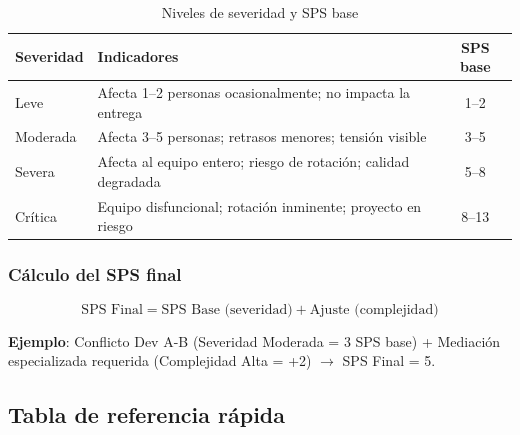 \begin{table}[h]
    \centering
    \small
    \begin{tabularx}{\textwidth}{|l|X|c|}
        \hline
        \textbf{Severidad} & \textbf{Indicadores}                                           & \textbf{SPS base} \\
        \hline
        Leve
                           & Afecta 1--2 personas ocasionalmente; no impacta la entrega
                           & 1--2                                                                               \\
        \hline
        Moderada
                           & Afecta 3--5 personas; retrasos menores; tensión visible
                           & 3--5                                                                               \\
        \hline
        Severa
                           & Afecta al equipo entero; riesgo de rotación; calidad degradada
                           & 5--8                                                                               \\
        \hline
        Crítica
                           & Equipo disfuncional; rotación inminente; proyecto en riesgo
                           & 8--13                                                                              \\
        \hline
    \end{tabularx}
    \caption{Niveles de severidad y SPS base}
    \label{tab:severidad-sps}
\end{table}

\FloatBarrier

\subsubsection{Cálculo del SPS final}

\begin{equation}
    \text{SPS Final} = \text{SPS Base (severidad)} + \text{Ajuste (complejidad)}
\end{equation}

\textbf{Ejemplo}: Conflicto Dev A-B (Severidad Moderada = 3 SPS base) + Mediación especializada requerida (Complejidad Alta = +2) $\rightarrow$ SPS Final = 5.

\subsection{Tabla de referencia rápida}

